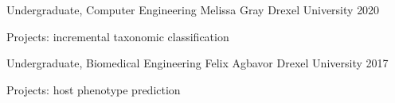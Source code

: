 \begin{cventries}

\cventry
    {Undergraduate, Computer Engineering}
    {Melissa Gray}
    {Drexel University}
    {2020}
    {\begin{cvitems}
        \item Projects: incremental taxonomic classification
    \end{cvitems}}
    
\cventry
    {Undergraduate, Biomedical Engineering}
    {Felix Agbavor}
    {Drexel University}
    {2017}
    {\begin{cvitems}
        \item Projects: host phenotype prediction
    \end{cvitems}}

\end{cventries}


    

    



